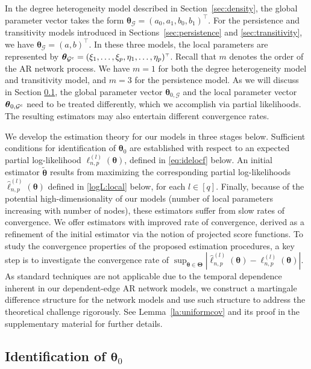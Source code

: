 \documentclass[12pt]{article}
\newcommand{\bTheta}{\boldsymbol \Theta}
\newcommand{\btheta}{\boldsymbol \theta}
\def\T{{\scriptscriptstyle \top} }
\newcommand{\btc}{{\rm c}}
\newcommand{\0}{{\bf 0}}
\begin{document}
In the degree heterogeneity model described in Section~{\rm\ref{sec:density}}, the global parameter vector takes the form $\btheta_{\mathcal{G}} = (a_0, a_1, b_0, b_1)^{\T}$. For the persistence and transitivity models introduced in Sections~{\rm\ref{sec:persistence}} and {\rm\ref{sec:transitivity}}, we have $\btheta_{\mathcal{G}} = (a, b)^{\T}$. In these three models, the local parameters are represented by $\btheta_{\mathcal{G}^{\btc}} = (\xi_1, \dots, \xi_p, \eta_1, \dots, \eta_p)^{\T}$. Recall that $m$ denotes the order of the AR network process. We have $m = 1$ for both the degree heterogeneity model and transitivity model, and $m = 3$ for the persistence model. As we will  discuss in Section \ref{sec:globaliden}, the global parameter vector $\btheta_{0,\mathcal{G}}$ and the local parameter vector $\btheta_{0,\mathcal{G}^{\btc}}$ need to be treated differently, which we accomplish via partial likelihoods. The resulting estimators may also entertain different convergence rates.



We develop the estimation theory for our models in three stages below.  Sufficient conditions for identification of $\btheta_0$ are established with respect to an expected partial log-likelihood 
$\ell^{(l)}_{n,p}(\btheta)$, defined in \eqref{eq:idelocf} below.  An initial estimator $\tilde{\btheta}$ results from maximizing the corresponding partial log-likelihoods $\hat \ell^{(l)}_{n,p}(\btheta)$ defined in \eqref{logL:local} below, for each $l\in[q]$.   
  Finally, because of the potential high-dimensionality of our models (number of local parameters increasing with number of nodes), these estimators suffer from slow rates of convergence.  We offer estimators with improved rate of convergence, derived as a refinement of the initial estimator via the notion of projected score functions. To study the convergence properties of the proposed estimation procedures, a key step is to investigate  the convergence rate of
$\sup_{\btheta \in \bTheta}|\hat{\ell}_{n,p}^{(l)}(\btheta) - \ell_{n,p}^{(l)}(\btheta)|$. As standard techniques are not applicable due to the temporal dependence inherent in our dependent-edge AR network models, we construct  a martingale difference structure for the network models and use such structure to address the theoretical challenge rigorously. See Lemma~\ref{la:uniformcov} and its proof in the supplementary material for further details.

\subsection{Identification of $\btheta_{0}$}\label{sec:globaliden}
\end{document}
